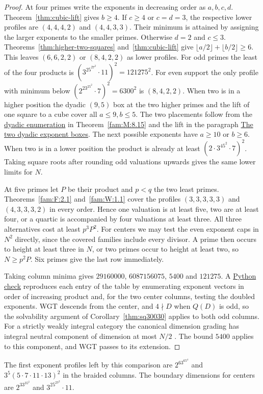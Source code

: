 \documentclass[11pt,a4paper]{article}
\numberwithin{equation}{section}
\theoremstyle{remark}
\begin{document}
\begin{proof}
At four primes write the exponents in decreasing order as $a,b,c,d$.
Theorem~\ref{thm:cubic-lift} gives $b\ge4$. If $c\ge4$ or $c=d=3$,
the respective lower profiles are $(4,4,4,2)$ and $(4,4,3,3)$. Their
minimum is attained by assigning the larger exponents to the smaller
primes. Otherwise $d=2$ and $c\le3$. Theorems~\ref{thm:higher-two-squares}
and~\ref{thm:cubic-lift} give
$\lfloor a/2\rfloor+\lfloor b/2\rfloor\ge6$. This leaves
$(6,6,2,2)$ or $(8,4,2,2)$ as lower profiles. For odd primes the least
of the four products is $(3^25^27^2\cdot11)^2=121275^2$.
For even support the only profile with minimum below
$(2^23^25^2\cdot7)^2=6300^2$ is $(8,4,2,2)$. When two is in a higher
position the dyadic $(9,5)$ box at the two higher primes and the lift of one
square to a cube cover all $a\le9,b\le5$. The two placements follow from the \href{https://github.com/sebastienpalcoux/WGT-fusion-categories/blob/f7f9f9a02f3116e61eb9dca4eebfed77001494e8/code/four_primes/dyadic_total_height.py}{dyadic enumeration} in Theorem~\ref{fam:M:8.15} and the lift in the paragraph \hyperref[fam:W:dyadic-boxes]{The two dyadic exponent boxes}.
The next possible exponents have $a\ge10$ or $b\ge6$. When two is
in a lower position the product is already at least $(2\cdot3^45^2
\cdot7)^2$. Taking square roots after rounding odd valuations upwards
gives the same lower limits for $N$.

At five primes let $P$ be their product and $p<q$ the two least primes.
Theorems~\ref{fam:F:2.1} and~\ref{fam:W:1.1} cover the profiles
$(3,3,3,3,3)$ and $(4,3,3,3,2)$ in every order. Hence one valuation is at
least five, two are at least four, or a quartic is accompanied by four
valuations at least three. All three alternatives cost at least $p^3P^2$.
For centers we may test the even exponent caps in $N^2$ directly, since
the covered families include every divisor. A prime then occurs to height
at least three in $N$, or two primes occur to height at least two, so
$N\ge p^2P$. Six primes give the last row immediately.

Taking column minima gives $29160000$, $6087156075$, $5400$ and $121275$. A
\href{https://github.com/sebastienpalcoux/WGT-fusion-categories/blob/48d2813db714e314684fd79f5ba565b81c16a2be/code/check_dimension_bounds.py}{Python check}
reproduces each entry of the table by enumerating exponent vectors in order of
increasing product and, for the two center columns, testing the doubled exponents.
WGT descends from the center, and $4\nmid D$ when $Q(D)$ is odd, so the
solvability argument of Corollary~\ref{thm:sq30030} applies to both odd
columns. For a strictly weakly integral category the canonical dimension
grading has integral neutral component of dimension at most $N/2$
\cite[Theorem~3.10]{GNnil}. The bound $5400$ applies to this component,
and WGT passes to its extension.
\end{proof}
The first exponent profiles left by this comparison are
$2^63^65^4$ and $3^5(5\cdot7\cdot11\cdot13)^2$ in the braided columns.
The boundary dimensions for centers are $2^33^35^2$ and $3^25^27^2\cdot11$.
\end{document}

